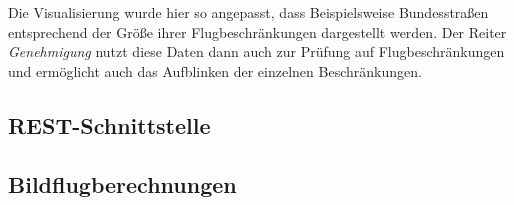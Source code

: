\documentclass[a4paper,12pt,bibliography=totoc, listof=totoc,titlepage]{scrartcl}
\begin{document}
Die Visualisierung wurde hier so angepasst, dass Beispielsweise Bundesstraßen entsprechend der Größe ihrer Flugbeschränkungen dargestellt werden. Der Reiter \textit{Genehmigung} nutzt diese Daten dann auch zur Prüfung auf Flugbeschränkungen und ermöglicht auch das Aufblinken der einzelnen Beschränkungen.

\subsection{REST-Schnittstelle}

\subsection{Bildflugberechnungen}

\renewcommand\UrlFont\itshape
\renewcommand{\refname}{Literaturverzeichnis}

\listoffigures
\end{document}
